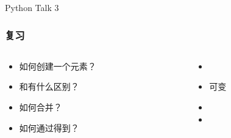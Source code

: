 


\begin{CJK}{UTF8}{gbsn}

\PreFirstFrame
\begin{frame} [fragile]
	\centerline{\fontsize{42}{42}\selectfont Python Talk 3}
\end{frame}
\PostFirstFrame

\begin{frame} [fragile]
	\frametitle{复习}
	\linespread{1.5}
	\begin{columns}[T]
		\begin{column}[T]{.7\textwidth}
			\begin{itemize}
			\item 如何创建一个元素？
			\item {}和有什么区别？
			\item 如何合并？
			\item 如何通过得到？
			\end{itemize}
		\end{column}
		\begin{column}[T]{.3\textwidth}
			\begin{itemize}
			\item {}
			\item {}可变
			\item {}
			\item \inlinePython{[1: 8: 2]}
			\end{itemize}
		\end{column}
	\end{columns}
\end{frame}


\end{CJK}
